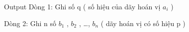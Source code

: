 Output
Dòng 1: Ghi số q ( số hiệu của dãy hoán vị $a_{i}$   )  

   Dòng 2: Ghi n số $b_{1}$   , $b_{2}$   , …, $b_{n}$   ( dãy hoán vị có số hiệu p )